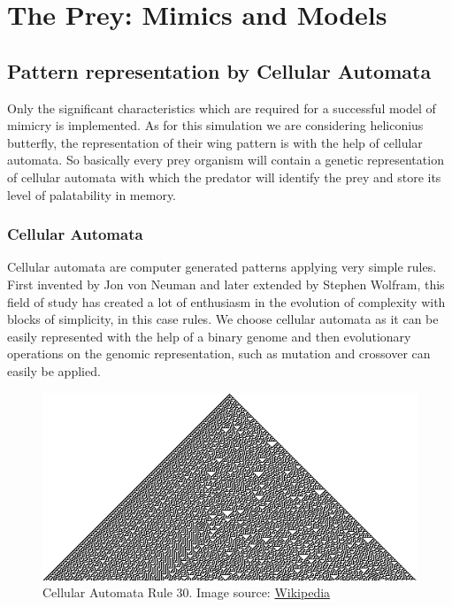 \section{The Prey: Mimics and Models}

\subsection{Pattern representation by Cellular Automata}
Only the significant characteristics which are required for a successful model of mimicry is implemented. As for this simulation we are considering heliconius butterfly, the representation of their wing pattern is with the help of cellular automata. So basically every prey organism will contain a genetic representation of cellular automata with which the predator will identify the prey and store its level of palatability in memory.

\subsubsection{Cellular Automata}

Cellular automata are computer generated patterns applying very simple rules. First invented by Jon von Neuman and later extended by Stephen Wolfram, this field of study has created a lot of enthusiasm in the evolution of complexity with blocks of simplicity, in this case rules. We choose cellular automata as it can be easily represented with the help of a binary genome and then evolutionary operations on the genomic representation, such as mutation and crossover can easily be applied.

\begin{figure}[H]
	\centering
	\includegraphics[scale=5]{images/CA_rule30s}
	\caption[Cellular Automata]{Cellular Automata Rule 30.
	Image source: \href{http://en.wikipedia.org/wiki/Cellular_automata}{Wikipedia}}
	\label{fig:cellular-automata-rule-30}
\end{figure}

